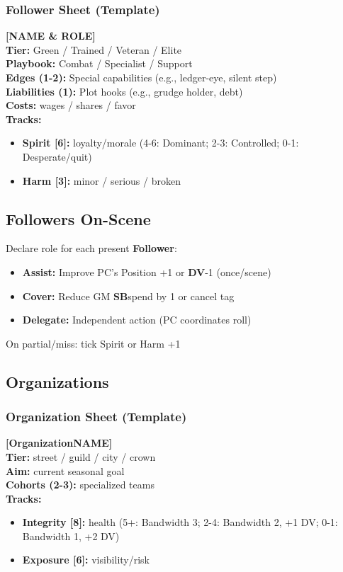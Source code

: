 \documentclass[10pt]{article}
\newcommand{\follower}{\textbf{Follower}}
\newcommand{\organisation}{\textbf{Organization}}
\newcommand{\sbtext}{\textbf{SB}}
\newcommand{\dv}{\textbf{DV}}
\newcommand{\timer}[1]{\textbf{[#1]}}
\newcommand{\tier}{\textbf{Tier}}
\begin{document}
\subsubsection{Follower Sheet (Template)}
\textbf{[NAME \& ROLE]} \\
\textbf{\tier:} Green / Trained / Veteran / Elite \\
\textbf{Playbook:} Combat / Specialist / Support \\
\textbf{Edges (1-2):} Special capabilities (e.g., ledger-eye, silent step) \\
\textbf{Liabilities (1):} Plot hooks (e.g., grudge holder, debt) \\
\textbf{Costs:} wages / shares / favor \\
\textbf{Tracks:}
\begin{itemize}[noitemsep]
\item \textbf{Spirit \timer{6}:} loyalty/morale (4-6: Dominant; 2-3: Controlled; 0-1: Desperate/quit)
\item \textbf{Harm \timer{3}:} minor / serious / broken
\end{itemize}

\subsection{Followers On-Scene}
Declare role for each present \follower:
\begin{itemize}[noitemsep]
\item \textbf{Assist:} Improve PC's Position +1 or \dv -1 (once/scene)
\item \textbf{Cover:} Reduce GM \sbtext spend by 1 or cancel tag
\item \textbf{Delegate:} Independent action (PC coordinates roll)
\end{itemize}
On partial/miss: tick Spirit or Harm +1

\subsection{Organizations}
\subsubsection{Organization Sheet (Template)}
\textbf{[\organisation NAME]} \\
\textbf{\tier:} street / guild / city / crown \\
\textbf{Aim:} current seasonal goal \\
\textbf{Cohorts (2-3):} specialized teams \\
\textbf{Tracks:}
\begin{itemize}[noitemsep]
\item \textbf{Integrity \timer{8}:} health (5+: Bandwidth 3; 2-4: Bandwidth 2, +1 DV; 0-1: Bandwidth 1, +2 DV)
\item \textbf{Exposure \timer{6}:} visibility/risk
\end{itemize}
\end{document}
